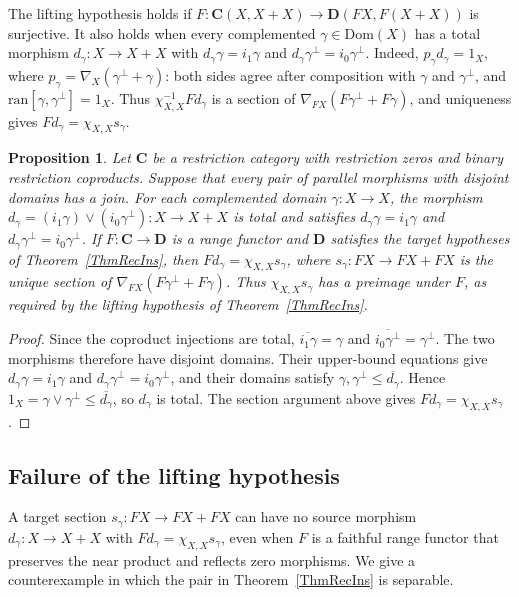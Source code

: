 \documentclass[letterpaper,10pt]{amsart}
\theoremstyle{plain}
\newtheorem{prop}{Proposition}[thm]
\theoremstyle{definition}
\newcommand{\rst}[1]{\overline{#1}}
\begin{document}
The lifting hypothesis holds if
$F:\mathbf C(X,X+X)\to\mathbf D(FX,F(X+X))$ is surjective. It also holds
when every complemented $\gamma\in\mathrm{Dom}(X)$ has a total
morphism $d_\gamma:X\to X+X$ with
$d_\gamma\gamma=i_1\gamma$ and
$d_\gamma\gamma^\perp=i_0\gamma^\perp$. Indeed,
$p_\gamma d_\gamma=1_X$, where
$p_\gamma=\nabla_X(\gamma^\perp+\gamma)$: both sides agree after
composition with $\gamma$ and $\gamma^\perp$, and
$\mathrm{ran}[\gamma,\gamma^\perp]=1_X$. Thus
$\chi_{X,X}^{-1}Fd_\gamma$ is a section of
$\nabla_{FX}(F\gamma^\perp+F\gamma)$, and uniqueness gives
$Fd_\gamma=\chi_{X,X}s_\gamma$.

\begin{prop}\label{PropDisjointJoins}
Let $\mathbf C$ be a restriction category with restriction zeros and
binary restriction coproducts. Suppose that every pair of parallel
morphisms with disjoint domains has a join. For each complemented
domain $\gamma:X\to X$, the morphism
$d_\gamma=(i_1\gamma)\vee(i_0\gamma^\perp):X\to X+X$
is total and satisfies $d_\gamma\gamma=i_1\gamma$ and
$d_\gamma\gamma^\perp=i_0\gamma^\perp$.
If $F:\mathbf C\to\mathbf D$ is a range functor and $\mathbf D$
satisfies the target hypotheses of Theorem~\ref{ThmRecIns}, then
$Fd_\gamma=\chi_{X,X}s_\gamma$, where $s_\gamma:FX\to FX+FX$
is the unique section of $\nabla_{FX}(F\gamma^\perp+F\gamma)$.
Thus $\chi_{X,X}s_\gamma$ has a preimage under $F$, as required
by the lifting hypothesis of
Theorem~\ref{ThmRecIns}.
\end{prop}
\begin{proof}
Since the coproduct injections are total,
$\rst{i_1\gamma}=\gamma$ and
$\rst{i_0\gamma^\perp}=\gamma^\perp$. The two morphisms therefore
have disjoint domains. Their upper-bound equations give
$d_\gamma\gamma=i_1\gamma$ and
$d_\gamma\gamma^\perp=i_0\gamma^\perp$, and their domains satisfy
$\gamma,\gamma^\perp\le\rst{d_\gamma}$. Hence
$1_X=\gamma\vee\gamma^\perp\le\rst{d_\gamma}$, so $d_\gamma$ is
total. The section argument above gives
$Fd_\gamma=\chi_{X,X}s_\gamma$.
\end{proof}

\subsection{Failure of the lifting hypothesis}\label{sec:counterexample}
A target section $s_\gamma:FX\to FX+FX$ can have no source
morphism $d_\gamma:X\to X+X$ with
$Fd_\gamma=\chi_{X,X}s_\gamma$, even when $F$ is a faithful range
functor that preserves the near product and reflects zero morphisms. We give a counterexample
in which the pair in Theorem~\ref{ThmRecIns} is separable.
\end{document}
